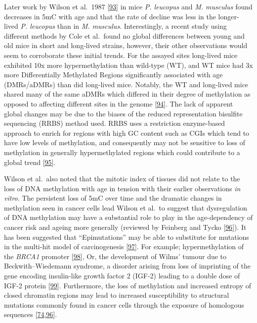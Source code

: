\documentclass[
]{book}
\begin{document}
Later work by Wilson et al.~1987 {[}\protect\hyperlink{ref-Wilson1987}{93}{]} in mice \emph{P. leucopus} and \emph{M. musculus} found decreases in 5mC with age and that the rate of decline was less in the longer-lived \emph{P. leucopus} than in \emph{M. musculus}.
Interestingly, a recent study using different methods by Cole et al.~found no global differences between young and old mice in short and long-lived strains, however, their other observations would seem to corroborate these initial trends.
For the assayed sites long-lived mice exhibited 10x more hypermethylation than wild-type (WT), and WT mice had 3x more Differentially Methylated Regions significantly associated with age (DMRs/aDMRs) than did long-lived mice.
Notably, the WT and long-lived mice shared many of the same aDMRs which differed in their degree of methylation as opposed to affecting different sites in the genome {[}\protect\hyperlink{ref-Cole2017}{94}{]}.
The lack of apparent global changes may be due to the biases of the reduced representation bisulfite sequencing (RRBS) method used.
RRBS uses a restriction enzyme-based approach to enrich for regions with high GC content such as CGIs which tend to have low levels of methylation, and consequently may not be sensitive to loss of methylation in generally hypermethylated regions which could contribute to a global trend {[}\protect\hyperlink{ref-Meissner2005}{95}{]}.

Wilson et al.~also noted that the mitotic index of tissues did not relate to the loss of DNA methylation with age in tension with their earlier observations \emph{in vitro}.
The persistent loss of 5mC over time and the dramatic changes in methylation seen in cancer cells lead Wilson et al.~to suggest that dysregulation of DNA methylation may have a substantial role to play in the age-dependency of cancer risk and ageing more generally (reviewed by Feinberg and Tycko {[}\protect\hyperlink{ref-Feinberg2004}{96}{]}).
It has been suggested that ``Epimutations'' may be able to substitute for mutations in the multi-hit model of carcinogenesis {[}\protect\hyperlink{ref-Knudson1971}{97}{]}.
For example; hypermethylation of the \emph{BRCA1} promoter {[}\protect\hyperlink{ref-Esteller2000}{98}{]}, Or, the development of Wilms' tumour due to Beckwith--Wiedemann syndrome, a disorder arising from loss of imprinting of the gene encoding insulin-like growth factor 2 (IGF-2) leading to a double dose of IGF-2 protein {[}\protect\hyperlink{ref-Feinberg2018}{99}{]}.
Furthermore, the loss of methylation and increased entropy of closed chromatin regions may lead to increased susceptibility to structural mutations commonly found in cancer cells through the exposure of homologous sequences {[}\protect\hyperlink{ref-Jenkinson2017}{74},\protect\hyperlink{ref-Feinberg2004}{96}{]}.
\end{document}
